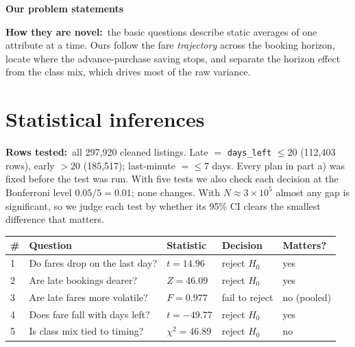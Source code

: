\documentclass[10pt,a4paper,twocolumn]{article}
\newcommand{\eg}[1]{#1}
\newcommand{\field}[2]{\textbf{#1}~\eg{#2}\par}
\newcommand{\minihead}[1]{\par\needspace{8\baselineskip}\smallskip\textbf{#1}\par}
\newcommand{\code}[1]{\texttt{#1}}
\begin{document}
\minihead{Our problem statements}
\noindent{}

\field{How they are novel:}{the basic questions describe static averages of one attribute at a
time. Ours follow the fare \emph{trajectory} across the booking horizon, locate where the
advance-purchase saving stops, and separate the horizon effect from the class mix, which drives
most of the raw variance.}

\section{Statistical inferences}

\field{Rows tested:}{all 297,920 cleaned listings. Late $=$ \code{days\_left} $\le20$
(112,403 rows), early $>20$ (185,517); last-minute $=\le7$ days. Every plan in part a) was fixed
before the test was run. With five tests we also check each decision at the Bonferroni level
$0.05/5=0.01$; none changes. With $N\approx3\times10^5$ almost any gap is significant, so we judge
each test by whether its 95\% CI clears the smallest difference that matters.}

{\footnotesize
\begin{tabularx}{\linewidth}{@{}L{0.25cm} Y L{1.45cm} L{1.2cm} L{1.0cm}@{}}
\toprule
\textbf{\#} & \textbf{Question} & \textbf{Statistic} & \textbf{Decision} & \textbf{Matters?} \\
 & Do fares drop on the last day? & $t=14.96$ & reject $H_0$ & yes \\
2 & Are late bookings dearer? & $Z=46.09$ & reject $H_0$ & yes \\
3 & Are late fares more volatile? & $F=0.977$ & fail to reject & no (pooled) \\
4 & Does fare fall with days left? & $t=-49.77$ & reject $H_0$ & yes \\
5 & Is class mix tied to timing? & $\chi^2=46.89$ & reject $H_0$ & no \\
\bottomrule
\end{tabularx}}
\end{document}

